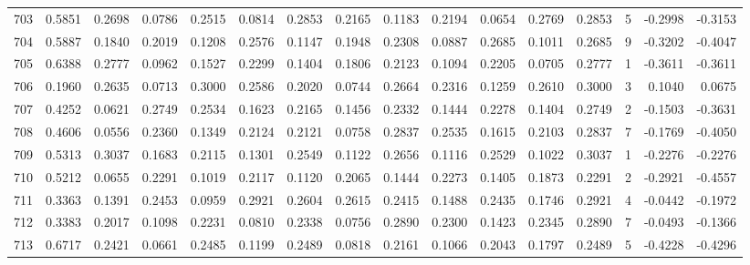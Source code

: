 \begin{tabular}{lrrrrrrrrrrrrrrr}
703 &      0.5851 &  0.2698 &  0.0786 &  0.2515 &  0.0814 &  0.2853 &  0.2165 &  0.1183 &  0.2194 &  0.0654 &   0.2769 &     0.2853 &      5 &                   -0.2998 &                    -0.3153 \\
704 &      0.5887 &  0.1840 &  0.2019 &  0.1208 &  0.2576 &  0.1147 &  0.1948 &  0.2308 &  0.0887 &  0.2685 &   0.1011 &     0.2685 &      9 &                   -0.3202 &                    -0.4047 \\
705 &      0.6388 &  0.2777 &  0.0962 &  0.1527 &  0.2299 &  0.1404 &  0.1806 &  0.2123 &  0.1094 &  0.2205 &   0.0705 &     0.2777 &      1 &                   -0.3611 &                    -0.3611 \\
706 &      0.1960 &  0.2635 &  0.0713 &  0.3000 &  0.2586 &  0.2020 &  0.0744 &  0.2664 &  0.2316 &  0.1259 &   0.2610 &     0.3000 &      3 &                    0.1040 &                     0.0675 \\
707 &      0.4252 &  0.0621 &  0.2749 &  0.2534 &  0.1623 &  0.2165 &  0.1456 &  0.2332 &  0.1444 &  0.2278 &   0.1404 &     0.2749 &      2 &                   -0.1503 &                    -0.3631 \\
708 &      0.4606 &  0.0556 &  0.2360 &  0.1349 &  0.2124 &  0.2121 &  0.0758 &  0.2837 &  0.2535 &  0.1615 &   0.2103 &     0.2837 &      7 &                   -0.1769 &                    -0.4050 \\
709 &      0.5313 &  0.3037 &  0.1683 &  0.2115 &  0.1301 &  0.2549 &  0.1122 &  0.2656 &  0.1116 &  0.2529 &   0.1022 &     0.3037 &      1 &                   -0.2276 &                    -0.2276 \\
710 &      0.5212 &  0.0655 &  0.2291 &  0.1019 &  0.2117 &  0.1120 &  0.2065 &  0.1444 &  0.2273 &  0.1405 &   0.1873 &     0.2291 &      2 &                   -0.2921 &                    -0.4557 \\
711 &      0.3363 &  0.1391 &  0.2453 &  0.0959 &  0.2921 &  0.2604 &  0.2615 &  0.2415 &  0.1488 &  0.2435 &   0.1746 &     0.2921 &      4 &                   -0.0442 &                    -0.1972 \\
712 &      0.3383 &  0.2017 &  0.1098 &  0.2231 &  0.0810 &  0.2338 &  0.0756 &  0.2890 &  0.2300 &  0.1423 &   0.2345 &     0.2890 &      7 &                   -0.0493 &                    -0.1366 \\
713 &      0.6717 &  0.2421 &  0.0661 &  0.2485 &  0.1199 &  0.2489 &  0.0818 &  0.2161 &  0.1066 &  0.2043 &   0.1797 &     0.2489 &      5 &                   -0.4228 &                    -0.4296 \\

\end{tabular}
